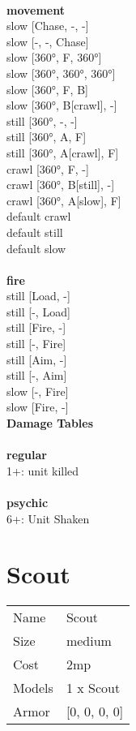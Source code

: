\ \\ {\bf movement } \\
slow [Chase, -, -] \\
slow [-, -, Chase] \\
slow [360°, F, 360°] \\
slow [360°, 360°, 360°] \\
slow [360°, F, B] \\
slow [360°, B[crawl], -] \\
still [360°, -, -] \\
still [360°, A, F] \\
still [360°, A[crawl], F] \\
crawl [360°, F, -] \\
crawl [360°, B[still], -] \\
crawl [360°, A[slow], F] \\
default crawl \\
default still \\
default slow \\
\ \\ {\bf fire } \\
still [Load, -] \\
still [-, Load] \\
still [Fire, -] \\
still [-, Fire] \\
still [Aim, -] \\
still [-, Aim] \\
slow [-, Fire] \\
slow [Fire, -] \\


{\bf Damage Tables} \\
\ \\ {\bf regular } \\
1+: unit killed \\
\ \\ {\bf psychic } \\
6+: Unit Shaken \\










\pagebreak\pagebreak

\section{ Scout }

\begin{tabular}{ll}
  Name & Scout \\
  Size & medium\\
  Cost & 2mp\\
  Models & 1 x Scout\\
  Armor & [0, 0, 0, 0]\\
\end{tabular}

